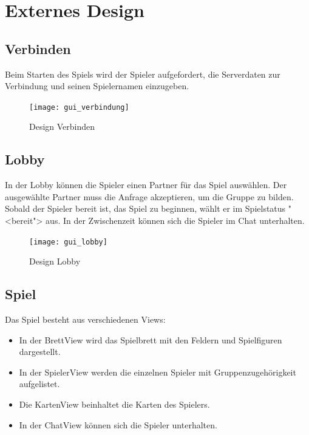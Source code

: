 \documentclass[12pt,halfparskip]{scrartcl}
\begin{document}
\section{Externes Design} %
\label{externes_design}

\subsection{Verbinden}

Beim Starten des Spiels wird der Spieler aufgefordert, die Serverdaten zur Verbindung und seinen Spielernamen einzugeben.

\begin{figure}[h]
	\centering
	\texttt{[image: gui\_verbindung]}
	\caption{Design Verbinden}
	\label{fig:gui_verbindung}
\end{figure}

\clearpage

\subsection{Lobby} %
\label{externes_design_lobby}

In der Lobby können die Spieler einen Partner für das Spiel auswählen. Der ausgewählte Partner muss die Anfrage akzeptieren, um die Gruppe zu bilden. Sobald der Spieler bereit ist, das Spiel zu beginnen, wählt er im Spielstatus "<bereit"> aus. In der Zwischenzeit können sich die Spieler im Chat unterhalten.

\begin{figure}[h]
	\centering
	\texttt{[image: gui\_lobby]}
	\caption{Design Lobby}
	\label{fig:gui_lobby}
\end{figure}

\clearpage

\subsection{Spiel} %
\label{externes_design_spielbrett}

Das Spiel besteht aus verschiedenen Views:
\begin{itemize}
	\item In der BrettView wird das Spielbrett mit den Feldern und Spielfiguren dargestellt.
	\item In der SpielerView werden die einzelnen Spieler mit Gruppenzugehörigkeit aufgelistet.
	\item Die KartenView beinhaltet die Karten des Spielers.
	\item In der ChatView können sich die Spieler unterhalten.
\end{itemize}
\end{document}
